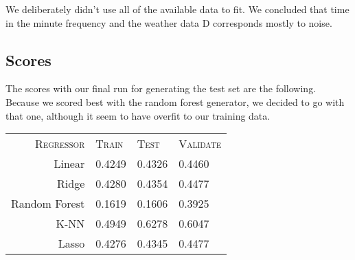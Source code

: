 \documentclass[a4paper, 11pt]{article}
\begin{document}
We deliberately didn't use all of the available data to fit.
We concluded that time in the minute frequency and the weather data D corresponds mostly to noise.

\subsection{Scores}

The scores with our final run for generating the test set are the following.
Because we scored best with the random forest generator, we decided to go with that one,
although it seem to have overfit to our training data.

\begin{tabular}{rlll}
\textsc{Regressor} & \textsc{Train} & \textsc{Test} & \textsc{Validate} \\
Linear        & 0.4249 & 0.4326 & 0.4460 \\
Ridge         & 0.4280 & 0.4354 & 0.4477 \\
Random Forest & 0.1619 & 0.1606 & 0.3925 \\
K-NN          & 0.4949 & 0.6278 & 0.6047 \\
Lasso         & 0.4276 & 0.4345 & 0.4477
\end{tabular}
\end{document}
